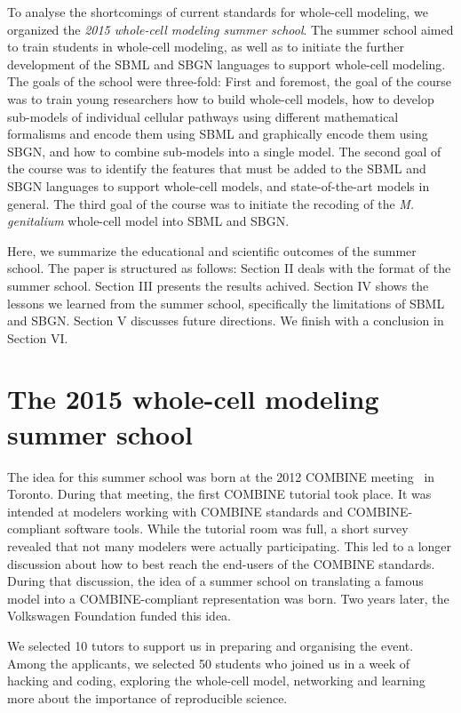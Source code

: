 \documentclass[journal,transmag]{IEEEtran}
\begin{document}
To analyse the shortcomings of current standards for whole-cell modeling, we organized the \emph{2015 whole-cell modeling summer school}. 
The summer school aimed to train students in whole-cell modeling, as well as to initiate the further development of the SBML and SBGN languages to support whole-cell modeling.  
The goals of the school were three-fold: 
First and foremost, the goal of the course was to train young researchers how to build whole-cell models, how to develop sub-models of individual cellular pathways using different mathematical formalisms and encode them using SBML and graphically encode them using SBGN, and how to combine sub-models into a single model. 
The second goal of the course was to identify the features that must be added to the SBML and SBGN languages to support whole-cell models, and state-of-the-art models in general. 
The third goal of the course was to initiate the recoding of the \textit{M. genitalium} whole-cell model into SBML and SBGN.

Here, we summarize the educational and scientific outcomes of the summer school. The paper is structured as follows: 
Section II deals with the format of the summer school.
Section III presents the results achived.  
Section IV shows the lessons we learned from the summer school, specifically  the limitations of SBML and SBGN. 
Section V discusses future directions. 
We finish with a conclusion in Section VI. 

\section{The 2015 whole-cell modeling summer school}

The idea for this summer school was born at the 2012 COMBINE meeting~\cite{COMBINE2012} in Toronto. During that meeting, the first COMBINE tutorial took place. It was intended at modelers working with COMBINE standards and COMBINE-compliant software tools. 
While the tutorial room was full, a short survey revealed that not many modelers were actually participating.  
This  led to a longer discussion about how to best reach the end-users of the COMBINE standards. 
During that discussion, the idea of a summer school on translating a famous model into a COMBINE-compliant representation was born. 
Two years later, the Volkswagen Foundation funded this idea. 

We selected 10 tutors to support us in preparing and organising the event. 
Among the applicants, we selected 50 students  who joined us in a week of hacking and coding, exploring the whole-cell model, networking and learning more about the importance of reproducible science.
\end{document}
